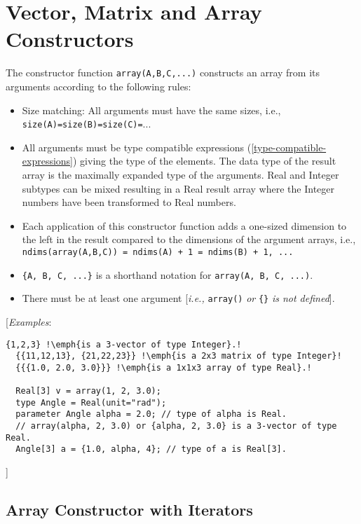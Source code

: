 \section{Vector, Matrix and Array Constructors}

The constructor function \lstinline!array(A,B,C,...)! constructs an array from its
arguments according to the following rules:

\begin{itemize}
\item
  Size matching: All arguments must have the same sizes, i.e.,
  \lstinline!size(A)=size(B)=size(C)=!...
\item
  All arguments must be type compatible expressions (\autoref{type-compatible-expressions}) giving
  the type of the elements. The data type of the result array is the
  maximally expanded type of the arguments. Real and Integer subtypes
  can be mixed resulting in a Real result array where the Integer
  numbers have been transformed to Real numbers.
\item
  Each application of this constructor function adds a one-sized
  dimension to the left in the result compared to the dimensions of the
  argument arrays, i.e., \lstinline!ndims(array(A,B,C)) = ndims(A) + 1 = ndims(B) + 1, ...!
\item
  \lstinline!{A, B, C, ...}! is a shorthand notation for \lstinline!array(A, B, C, ...)!.
\item
  There must be at least one argument {[}\emph{i.e.,} \lstinline!array()! \emph{or}
  \lstinline!{}! \emph{is not defined}{]}.
\end{itemize}

{[}\emph{Examples}:
\begin{lstlisting}[language=modelica, escapechar=!]
  {1,2,3} !\emph{is a 3-vector of type Integer}.!
  {{11,12,13}, {21,22,23}} !\emph{is a 2x3 matrix of type Integer}!
  {{{1.0, 2.0, 3.0}}} !\emph{is a 1x1x3 array of type Real}.!

  Real[3] v = array(1, 2, 3.0);
  type Angle = Real(unit="rad");
  parameter Angle alpha = 2.0; // type of alpha is Real.
  // array(alpha, 2, 3.0) or {alpha, 2, 3.0} is a 3-vector of type Real.
  Angle[3] a = {1.0, alpha, 4}; // type of a is Real[3].
\end{lstlisting}
{]}

\subsection{Array Constructor with Iterators}

